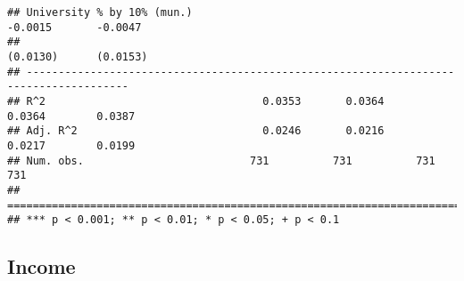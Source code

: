 \documentclass[
]{article}
\begin{document}
\begin{verbatim}
## University % by 10% (mun.)                                    -0.0015       -0.0047   
##                                                               (0.0130)      (0.0153)  
## --------------------------------------------------------------------------------------
## R^2                                  0.0353       0.0364       0.0364        0.0387   
## Adj. R^2                             0.0246       0.0216       0.0217        0.0199   
## Num. obs.                          731          731          731           731        
## ======================================================================================
## *** p < 0.001; ** p < 0.01; * p < 0.05; + p < 0.1
\end{verbatim}

\hypertarget{income-1}{%
\subsection{Income}\label{income-1}}
\end{document}
